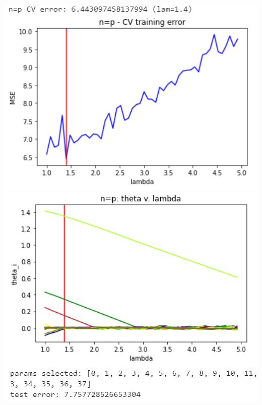 \documentclass[11pt]{article}
\begin{document}
\begin{center}
\includegraphics[scale=0.7]{charts/bgd_ortho_n_eq_p_err.PNG}
\includegraphics[scale=0.7]{charts/bgd_ortho_n_eq_p_thetas.PNG}


\end{center}
\end{document}

